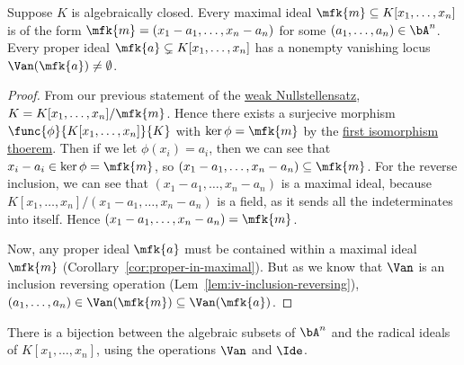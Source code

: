 \begin{lemma}\label{lem:weak-nullstellensatz}
    Suppose \(K\) is algebraically closed.
    Every maximal ideal \(\mfk{m} \subseteq K[x_1,\hdots,x_n]\) is of the form
    \(\mfk{m} = (x_1-a_1,\hdots,x_n-a_n)\) for some \((a_1,\hdots,a_n) \in \bA^n\).
    Every proper ideal \(\mfk{a} \subsetneq K[x_1,\hdots,x_n]\)
    has a nonempty vanishing locus \(\Van(\mfk{a}) \neq \emptyset\).
\end{lemma}
\begin{proof}
    From our previous statement of the \hyperref[cor:weak-nullstellensatz]{weak Nullstellensatz},
    \(K = K[x_1,\hdots,x_n]/\mfk{m}\).
    Hence there exists a surjecive morphism \(\func{\phi}{K[x_1,\hdots,x_n]}{K}\)
    with \(\ker\phi = \mfk{m}\) by the \hyperref[thm:iso-1-ring]{first isomorphism thoerem}.
    Then if we let \(\phi(x_i) = a_i\),
    then we can see that \(x_i-a_i \in \ker\phi = \mfk{m}\),
    so \((x_1-a_1,\hdots,x_n-a_n) \subseteq \mfk{m}\).
    For the reverse inclusion, we can see that \((x_1-a_1,\hdots,x_n-a_n)\) is a maximal ideal,
    because \(K[x_1,\hdots,x_n]/(x_1-a_1,\hdots,x_n-a_n)\) is a field,
    as it sends all the indeterminates into itself.
    Hence \((x_1-a_1,\hdots,x_n-a_n) = \mfk{m}\).

    Now, any proper ideal \(\mfk{a}\) must be contained within a maximal ideal \(\mfk{m}\)
    (Corollary~\ref{cor:proper-in-maximal}).
    But as we know that \(\Van\) is an inclusion reversing operation
    (Lem~\ref{lem:iv-inclusion-reversing}),
    \((a_1,\hdots,a_n) \in \Van(\mfk{m}) \subseteq \Van(\mfk{a})\).
\end{proof}
\begin{theorem}\label{thm:nullstellensatz}
    There is a bijection between the algebraic subsets of \(\bA^n\)
    and the radical ideals of \(K[x_1,\hdots,x_n]\),
    using the operations \(\Van\) and \(\Ide\).
\end{theorem}
